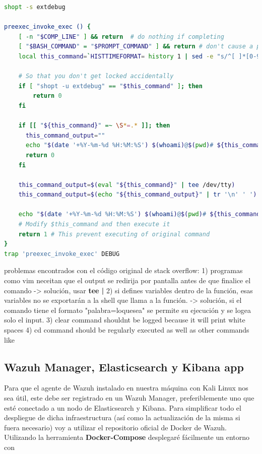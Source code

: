 \begin{lstlisting}[language=bash,caption={Session recorder (on bashrc file}]
shopt -s extdebug

preexec_invoke_exec () {
    [ -n "$COMP_LINE" ] && return  # do nothing if completing
    [ "$BASH_COMMAND" = "$PROMPT_COMMAND" ] && return # don't cause a preexec for $PROMPT_COMMAND
    local this_command=`HISTTIMEFORMAT= history 1 | sed -e "s/^[ ]*[0-9]*[ ]*//"`;

    # So that you don't get locked accidentally
    if [ "shopt -u extdebug" == "$this_command" ]; then
        return 0
    fi

    if [[ "${this_command}" =~ \S*=.* ]]; then
      this_command_output=""
      echo "$(date '+%Y-%m-%d %H:%M:%S') $(whoami)@$(pwd)# ${this_command}: $this_command_output"
      return 0
    fi

    this_command_output=$(eval "${this_command}" | tee /dev/tty)
    this_command_output=$(echo "${this_command_output}" | tr '\n' ' ')

    echo "$(date '+%Y-%m-%d %H:%M:%S') $(whoami)@$(pwd)# ${this_command}: $this_command_output"
    # Modify $this_command and then execute it
    return 1 # This prevent executing of original command
}
trap 'preexec_invoke_exec' DEBUG
\end{lstlisting}

problemas encontrados con el código original de stack overflow:
1) programas como vim neceitan que el output se redirija por pantalla antes de que finalice el comando -> solución, usar \textbf{tee |}
2) si defines variables dentro de la función, esas variables no se exportarán a la shell que llama a la función. -> solución, si el comando tiene el formato "palabra=loquesea" se permite su ejecución y se logea solo el input.
3) clear command shouldnt be logged because it will print white spaces
4) cd command should be regularly executed as well as other commands like 


\subsection{Wazuh Manager, Elasticsearch y Kibana app}
Para que el agente de Wazuh instalado en nuestra máquina con Kali Linux nos sea útil, este debe ser registrado en un Wazuh Manager, preferiblemente uno que esté conectado a un nodo de Elasticsearch y Kibana. Para simplificar todo el despliegue de dicha infraestructura (así como la actualización de la misma si fuera necesario) voy a utilizar el repositorio oficial de Docker de Wazuh. Utilizando la herramienta \textbf{Docker-Compose} desplegaré fácilmente un entorno con 
 


